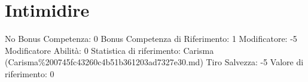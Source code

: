 \section{Intimidire}\label{intimidire}

\begin{description}
\tightlist
\item[Tags: ABI]
No Bonus Competenza: 0 Bonus Competenza di Riferimento: 1 Modificatore:
-5 Modificatore Abilità: 0 Statistica di riferimento: Carisma
(Carisma\%200745fc43260c4b51b361203ad7327e30.md) Tiro Salvezza: -5
Valore di riferimento: 0
\end{description}
